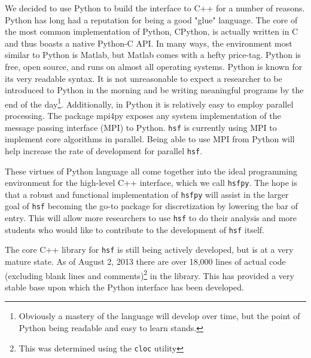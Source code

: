     We decided to use Python to build the interface to C++ for a number of reasons. Python has long had a reputation for being a good "glue" language. The core of the most common implementation of Python, CPython, is actually written in C and thus boasts a native Python-C API. In many ways, the environment most similar to Python is Matlab, but Matlab comes with a hefty price-tag. Python is free, open source, and runs on almost all operating systems. Python is known for its very readable syntax. It is not unreasonable to expect a researcher to be introduced to Python in the morning and be writing meaningful programs by the end of the day\footnote{Obviously a mastery of the language will develop over time, but the point of Python being readable and easy to learn stands.}. Additionally, in Python it is relatively easy to employ parallel processing. The package mpi4py exposes any system implementation of the message passing interface (MPI) to Python. \texttt{hsf} is currently using MPI to implement core algorithms in parallel. Being able to use MPI from Python will help increase the rate of development for parallel \texttt{hsf}.

    These virtues of Python language all come together into the ideal programming environment for the high-level C++ interface, which we call \texttt{hsfpy}. The hope is that a robust and functional implementation of \texttt{hsfpy} will assist in the larger goal of \texttt{hsf} becoming the go-to package for discretization by lowering the bar of entry. This will allow more researchers to use \texttt{hsf} to do their analysis and more students who would like to contribute to the development of \texttt{hsf} itself.

    The core C++ library for \texttt{hsf} is still being actively developed, but is at a very mature state. As of August 2, 2013 there are over 18,000 lines of actual code (excluding blank lines and comments)\footnote{This was determined using the \texttt{cloc} utility} in the library. This has provided a very stable base upon which the Python interface has been developed.


